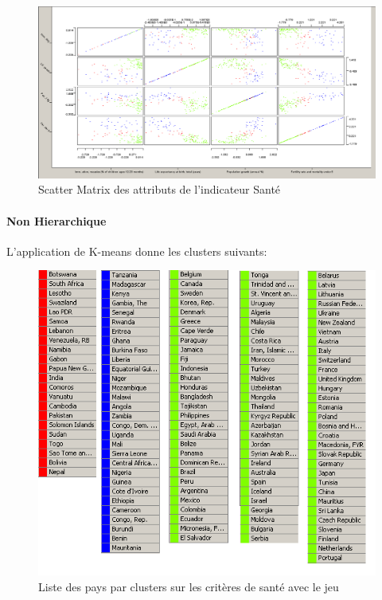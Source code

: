 \begin{figure}[H]
	\begin{center}
		\includegraphics[scale=0.5]{Image/ScatterMatrixSanteNoMissing2}
		\caption{Scatter Matrix des attributs de l'indicateur Santé \jeuc}
	\end{center}
\end{figure}

\paragraph{Non Hierarchique}
L'application de K-means donne les clusters suivants: 

\begin{figure}[H]
	\begin{center}
		\includegraphics[scale=0.5]{Image/TableViewSanteNoMissing2}
		\caption{Liste des pays par clusters sur les critères de santé avec le jeu \jeuc}
	\end{center}
\end{figure}


